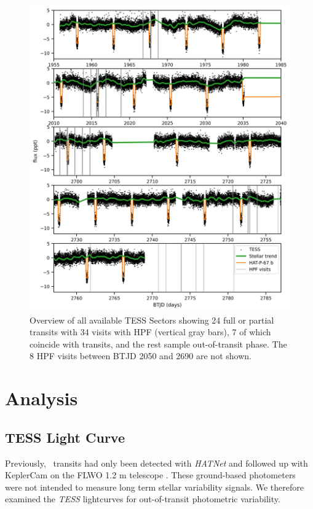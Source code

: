 \documentclass[twocolumn]{aastex631}
\newcommand{\hatp}{\object{HAT-P-67}~}
\begin{document}
\begin{figure}
    \centering
    \includegraphics[width=0.7\linewidth]{figures/TESS_HAT-P-67b_overview.png}
    \caption{Overview of all available TESS Sectors showing 24 full or partial transits with 34 visits with HPF (vertical gray bars), 7 of which coincide with transits, and the rest sample out-of-transit phase.  The 8 HPF visits between BTJD 2050 and 2690 are not shown.}
    \label{fig:TESSoverview}
\end{figure}


\section{Analysis}

\subsection{TESS Light Curve}
Previously, \hatp transits had only been detected with \emph{HATNet} \citep{2004PASP..116..266B} and followed up with KeplerCam on the FLWO 1.2 m telescope \citep{2017AJ....153..211Z}. These ground-based photometers were not intended to measure long term stellar variability signals.  We therefore examined the \emph{TESS} lightcurves for out-of-transit photometric variability.
\end{document}
